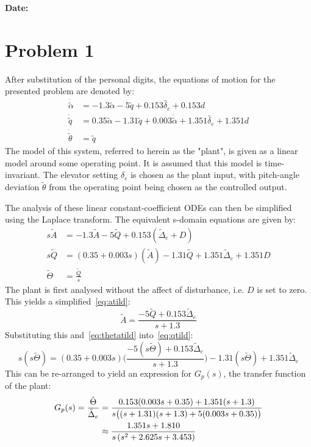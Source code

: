\documentclass[11pt,a4paper]{article}
\begin{document}
\noindent\textbf{Date:} \text{\today}
\newpage
\setcounter{page}{1}
\hypersetup{pageanchor=true}


\section{Problem 1}
After substitution of the personal digits, the equations of motion for the presented problem are denoted by: 
\begin{align*}
    \dot{\tilde{\alpha}} &= -1.3 \tilde{\alpha} -5 \tilde{q} + 0.153 \tilde{\delta_e} + 0.153d \\
    \dot{\tilde{q}} &= 0.35 \tilde{\alpha} -1.31\tilde{q} +0.003 \dot{\tilde{\alpha}} + 1.351\tilde{\delta_e} + 1.351d \\
    \dot{\tilde{\theta}} &= \tilde{q}
\end{align*}
The model of this system, referred to herein as the "plant", is given as a linear model around some operating point. It is assumed that this model is time-invariant. The elevator setting $\delta_e$ is chosen as the plant input, with pitch-angle deviation $\tilde{\theta}$ from the operating point being chosen as the controlled output.

The analysis of these linear constant-coefficient ODEs can then be simplified using the Laplace transform. The equivalent s-domain equations are given by:
\begin{align}
    s\tilde{A} &= -1.3\tilde{A} - 5\tilde{Q} + 0.153(\tilde{\Delta}_e + D) \label{eq:atild}\\
    s\tilde{Q} &= (0.35+ 0.003s)(\tilde{A}) -1.31\tilde{Q} + 1.351\tilde{\Delta}_e + 1.351D \label{eq:qtild} \\
    \tilde{\Theta} &= \frac{\tilde{Q}}{s} \label{eq:thetatild}
 \end{align}
The plant is first analysed without the affect of disturbance, i.e. $D$ is set to zero. This yields a simplified~\eqref{eq:atild}:
$$
    \tilde{A} = \frac{-5 \tilde{Q} + 0.153 \tilde{\Delta}_e}{s + 1.3}
$$
Substituting this and~\eqref{eq:thetatild} into~\eqref{eq:qtild}:
 $$
    s(s\tilde{\Theta}) = (0.35 + 0.003s) \bigg(\frac{-5(s\tilde{\Theta}) + 0.153\tilde{\Delta}_e}{s + 1.3} \bigg) - 1.31(s\tilde{\Theta}) + 1.351 \tilde{\Delta}_e
 $$
 This can be re-arranged to yield an expression for $G_p(s)$, the transfer function of the plant:
 \begin{align}
     G_p(s) = \frac{\tilde{\Theta}}{\tilde{\Delta}_e} &= \frac{0.153(0.003s + 0.35) + 1.351(s + 1.3)}{s\big((s + 1.31)(s + 1.3) + 5(0.003s + 0.35) \big)} \notag \\
      &\approx \frac{1.351s+1.810}{s\left(s^2+2.625s+3.453\right)} \label{eq:g_p(s)}
\end{align}
\end{document}
